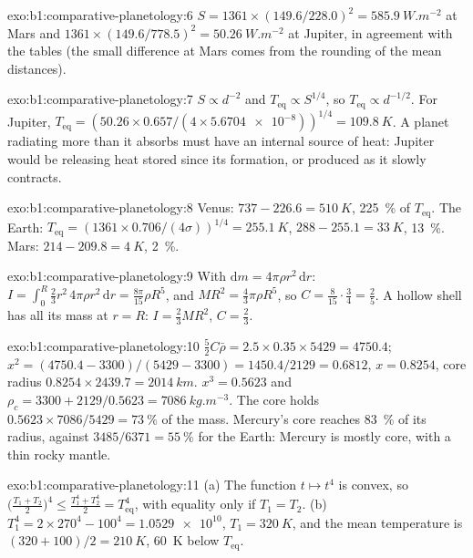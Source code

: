 \begin{solution}{exo:b1:comparative-planetology:6}
$S = 1361\times(149.6/228.0)^2 = \qty{585.9}{W.m^{-2}}$ at Mars and
$1361\times(149.6/778.5)^2 = \qty{50.26}{W.m^{-2}}$ at Jupiter, in agreement
with the tables (the small difference at Mars comes from the rounding of the
mean distances).
\end{solution}

\begin{solution}{exo:b1:comparative-planetology:7}
$S \propto d^{-2}$ and $T_\mathrm{eq} \propto S^{1/4}$, so $T_\mathrm{eq}
\propto d^{-1/2}$. For Jupiter, $T_\mathrm{eq} = (50.26\times0.657/(4\times
\num{5.6704e-8}))^{1/4} = \qty{109.8}{K}$. A planet radiating more than it
absorbs must have an internal source of heat: Jupiter would be releasing
heat stored since its formation, or produced as it slowly contracts.
\end{solution}

\begin{solution}{exo:b1:comparative-planetology:8}
Venus: $737 - 226.6 = \qty{510}{K}$, \qty{225}{\percent} of $T_\mathrm{eq}$.
The Earth: $T_\mathrm{eq} = (1361\times0.706/(4\sigma))^{1/4} = \qty{255.1}{K}$,
$288 - 255.1 = \qty{33}{K}$, \qty{13}{\percent}. Mars: $214 - 209.8 =
\qty{4}{K}$, \qty{2}{\percent}.
\end{solution}

\begin{solution}{exo:b1:comparative-planetology:9}
With $\mathrm dm = 4\pi\rho r^2\,\mathrm dr$: $I = \int_0^R\tfrac23r^2\,4\pi
\rho r^2\,\mathrm dr = \tfrac{8\pi}{15}\rho R^5$, and $MR^2 = \tfrac43\pi\rho
R^5$, so $C = \tfrac{8}{15}\cdot\tfrac34 = \tfrac25$. A hollow shell has all
its mass at $r = R$: $I = \tfrac23MR^2$, $C = \tfrac23$.
\end{solution}

\begin{solution}{exo:b1:comparative-planetology:10}
$\tfrac52C\bar\rho = 2.5\times0.35\times5429 = 4750.4$;
$x^2 = (4750.4 - 3300)/(5429 - 3300) = 1450.4/2129 = 0.6812$, $x = 0.8254$,
core radius $0.8254\times2439.7 = \qty{2014}{km}$. $x^3 = 0.5623$ and
$\rho_c = 3300 + 2129/0.5623 = \qty{7086}{kg.m^{-3}}$. The core holds
$0.5623\times7086/5429 = \qty{73}{\percent}$ of the mass. Mercury's core
reaches \qty{83}{\percent} of its radius, against $3485/6371 =
\qty{55}{\percent}$ for the Earth: Mercury is mostly core, with a thin rocky
mantle.
\end{solution}

\begin{solution}{exo:b1:comparative-planetology:11}
(a) The function $t\mapsto t^4$ is convex, so
$\bigl(\tfrac{T_1 + T_2}{2}\bigr)^4 \le \tfrac{T_1^4 + T_2^4}{2} =
T_\mathrm{eq}^4$, with equality only if $T_1 = T_2$. (b) $T_1^4 =
2\times270^4 - 100^4 = \num{1.0529e10}$, $T_1 = \qty{320}{K}$, and the mean
temperature is $(320 + 100)/2 = \qty{210}{K}$, \qty{60}{K} below
$T_\mathrm{eq}$.
\end{solution}

